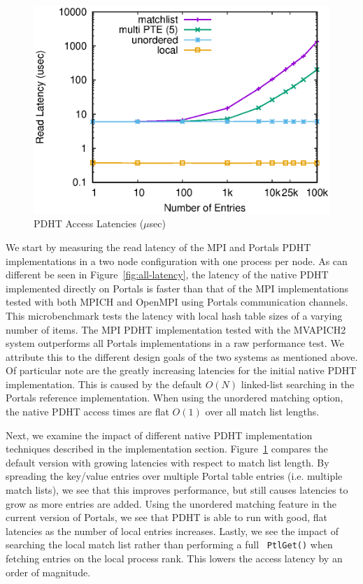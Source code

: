 \begin{figure}
  \centering
  \includegraphics[width=.9\linewidth]{plots/pdhtlatency}
  \caption{PDHT Access Latencies ($\mu$sec)}
  \label{fig:pdht-latency}
\end{figure}


We start by measuring the read latency of the MPI and Portals PDHT
implementations in a two node configuration with one process per node. As can
different be seen in Figure~\ref{fig:all-latency}, the latency of
the native PDHT implemented directly on Portals is faster than that of the MPI
implementations tested with both MPICH and OpenMPI using Portals communication
channels. This microbenchmark tests the latency with local hash table sizes of a varying
number of items. The MPI PDHT implementation tested with the MVAPICH2 system
outperforms all Portals implementations in a raw performance test. We attribute
this to the different design goals of the two systems as mentioned above. Of
particular note are the greatly increasing latencies for the initial native
PDHT implementation. This is caused by the default $O(N)$ linked-list searching in the
Portals reference implementation. When using the unordered matching option, the
native PDHT access times are flat $O(1)$ over all match list lengths.


Next, we examine the impact of different native PDHT implementation techniques
described in the implementation section. Figure~\ref{fig:pdht-latency} compares
the default version with growing latencies with respect to match list length.
By spreading the key/value entries over multiple Portal table entries (i.e.
multiple match lists), we see that this improves performance, but still causes
latencies to grow as more entries are added. Using the unordered matching
feature in the current version of Portals, we see that PDHT is able to run with
good, flat latencies as the number of local entries increases. Lastly, we see
the impact of searching the local match list rather than performing a full {\tt
  PtlGet()} when fetching entries on the local process rank. This lowers the
access latency by an order of magnitude.

